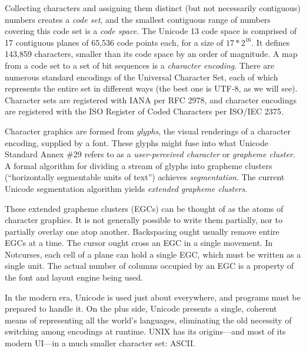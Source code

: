Collecting characters and assigning them distinct (but not necessarily contiguous)
numbers creates a \textit{code set}, and the smallest contiguous
range of numbers covering this code set is a \textit{code space}. The Unicode 13
code space is comprised of 17 contiguous planes of 65,536 code points each, for
a size of $17*2^{16}$. It defines 143,859 characters, smaller than its
code space by an order of magnitude. A map from a code set to a set of bit
sequences is a \textit{character encoding}. There are numerous standard
encodings of the Universal Character Set, each of which represents the entire
set in different ways (the best one is UTF-8, as we will see). Character sets
are registered with IANA per RFC 2978\cite{rfc2978}, and character encodings
are registered with the ISO Register of Coded Characters per ISO/IEC 2375\cite{iso2375}.

Character graphics are formed from \textit{glyphs}, the visual renderings of a
character encoding, supplied by a font. These glyphs might fuse into what
Unicode Standard Annex \#29\cite{annex29} refers to as a \textit{user-perceived
character} or \textit{grapheme cluster}. A formal algorithm for dividing a
stream of glyphs into grapheme clusters (``horizontally segmentable units of
text\cite{meaningcodepoints}'') achieves \textit{segmentation}. The current
Unicode segmentation algorithm yields \textit{extended grapheme clusters}.

These extended grapheme clusters (EGCs) can be thought of as the atoms of
character graphics. It is not generally possible to write them partially, nor
to partially overlay one atop another. Backspacing ought usually remove entire EGCs
at a time. The cursor ought cross an EGC in a single movement. In Notcurses,
each cell of a plane can hold a single EGC, which must be written as a single
unit. The actual number of columns occupied by an EGC is a property of the font
and layout engine being used.

In the modern era, Unicode is used just about everywhere, and programs must be
prepared to handle it. On the plus side, Unicode presents a single, coherent
means of representing all the world's languages, eliminating the old necessity
of switching among encodings at runtime. UNIX has its origins---and most of its
modern UI---in a much smaller character set: ASCII.

